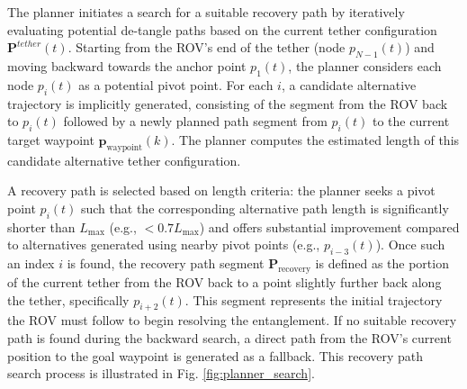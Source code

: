 The planner initiates a search for a suitable recovery path by iteratively evaluating potential de-tangle paths based on the current tether configuration \( \mathbf{P}^{tether}(t) \). Starting from the \ac{ROV}'s end of the tether (node \( p_{N-1}(t) \)) and moving backward towards the anchor point \( p_1(t) \), the planner considers each node \( p_i(t) \) as a potential pivot point. For each \( i \), a candidate alternative trajectory is implicitly generated, consisting of the segment from the \ac{ROV} back to \( p_i(t) \) followed by a newly planned path segment from \( p_i(t) \) to the current target waypoint \( \mathbf{p}_{\text{waypoint}}(k) \). The planner computes the estimated length of this candidate alternative tether configuration.

A recovery path is selected based on length criteria: the planner seeks a pivot point \( p_i(t) \) such that the corresponding alternative path length is significantly shorter than \( L_{\text{max}} \) (e.g., \( < 0.7 L_{\text{max}} \)) and offers substantial improvement compared to alternatives generated using nearby pivot points (e.g., \( p_{i-3}(t) \)). Once such an index \( i \) is found, the recovery path segment \( \mathbf{P}_{\text{recovery}} \) is defined as the portion of the current tether from the \ac{ROV} back to a point slightly further back along the tether, specifically \( p_{i+2}(t) \). This segment represents the initial trajectory the \ac{ROV} must follow to begin resolving the entanglement. If no suitable recovery path is found during the backward search, a direct path from the \ac{ROV}'s current position to the goal waypoint is generated as a fallback. This recovery path search process is illustrated in Fig. \ref{fig:planner_search}.  










